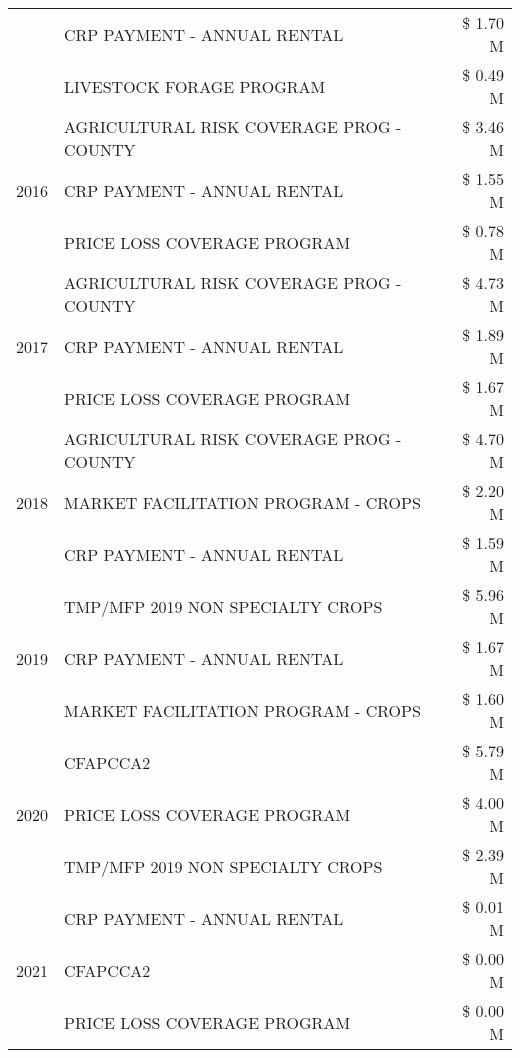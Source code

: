 \begin{tabular}{llr}
 & CRP PAYMENT - ANNUAL RENTAL & \$ 1.70 M \\
 & LIVESTOCK FORAGE PROGRAM & \$ 0.49 M \\
\cline{1-3}
\multirow[t]{3}{*}{2016} & AGRICULTURAL RISK COVERAGE PROG - COUNTY & \$ 3.46 M \\
 & CRP PAYMENT - ANNUAL RENTAL & \$ 1.55 M \\
 & PRICE LOSS COVERAGE PROGRAM & \$ 0.78 M \\
\cline{1-3}
\multirow[t]{3}{*}{2017} & AGRICULTURAL RISK COVERAGE PROG - COUNTY & \$ 4.73 M \\
 & CRP PAYMENT - ANNUAL RENTAL & \$ 1.89 M \\
 & PRICE LOSS COVERAGE PROGRAM & \$ 1.67 M \\
\cline{1-3}
\multirow[t]{3}{*}{2018} & AGRICULTURAL RISK COVERAGE PROG - COUNTY & \$ 4.70 M \\
 & MARKET FACILITATION PROGRAM - CROPS & \$ 2.20 M \\
 & CRP PAYMENT - ANNUAL RENTAL & \$ 1.59 M \\
\cline{1-3}
\multirow[t]{3}{*}{2019} & TMP/MFP 2019 NON SPECIALTY CROPS & \$ 5.96 M \\
 & CRP PAYMENT - ANNUAL RENTAL & \$ 1.67 M \\
 & MARKET FACILITATION PROGRAM - CROPS & \$ 1.60 M \\
\cline{1-3}
\multirow[t]{3}{*}{2020} & CFAPCCA2 & \$ 5.79 M \\
 & PRICE LOSS COVERAGE PROGRAM & \$ 4.00 M \\
 & TMP/MFP 2019 NON SPECIALTY CROPS & \$ 2.39 M \\
\cline{1-3}
\multirow[t]{3}{*}{2021} & CRP PAYMENT - ANNUAL RENTAL & \$ 0.01 M \\
 & CFAPCCA2 & \$ 0.00 M \\
 & PRICE LOSS COVERAGE PROGRAM & \$ 0.00 M \\
\cline{1-3}
\bottomrule
\end{tabular}
